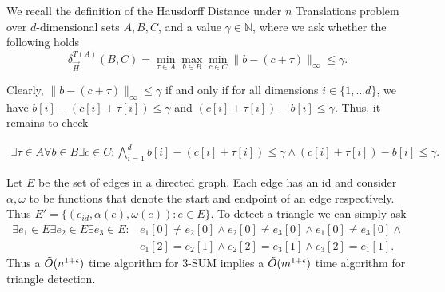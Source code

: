 \begin{example}\label{ex:hunt}
We recall the definition of the Hausdorff Distance under $n$ Translations problem over $d$-dimensional sets $A,B,C$, and a value $\gamma \in \mathbb{N}$, where we ask whether the following holds
 \[\delta_{\overrightarrow{H}}^{T(A)}(B,C) = \min_{\tau \in A} \max_{b\in B} \min_{c\in C} \|b-(c+\tau)\|_{\infty} \leq \gamma.\]


Clearly, $\|b-(c+\tau)\|_{\infty} \leq \gamma$ if and only if for all dimensions $i \in \{1,\dots d\}$, we have $b[i] -(c[i]+\tau[i]) \leq \gamma$ and $(c[i]+\tau[i])-b[i]\leq \gamma. $
Thus, it remains to check 

\begin{align*}
\exists \tau \in A \forall b \in B \exists c \in C: \bigwedge_{i=1}^{d} b[i] -(c[i]+\tau[i]) \leq \gamma \land (c[i]+\tau[i])-b[i]\leq \gamma.
\end{align*}
\end{example}
\begin{example}
\label{example:triangle}
Let $E$ be the set of edges in a directed graph. Each edge has an id and consider $\alpha,\omega$ to be functions that denote the start and endpoint of an edge respectively.
Thus $E'=\{(e_{id},\alpha(e),\omega(e)):e \in E\}$.
To detect a triangle we can simply ask 
\begin{align*}
\exists e_1 \in E \exists e_2 \in E \exists e_3 \in E:& e_1[0] \neq e_2[0] \land e_2[0] \neq e_3[0]\land e_1[0] \neq e_3[0] \land \\
&e_1[2]=e_2[1] \land e_2[2]=e_3[1] \land e_3[2]=e_1[1].
\end{align*}
Thus a $\Tilde{O}(n^{1+\epsilon})$ time algorithm for $3$-SUM implies a $\Tilde{O}(m^{1+\epsilon})$
time algorithm for triangle detection. 
\end{example}

